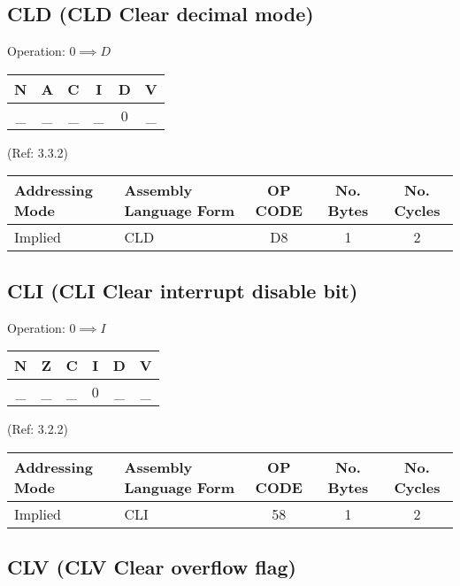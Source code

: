 \documentclass{article}
\begin{document}
  \subsection{CLD (CLD Clear decimal mode)}

  Operation:  $0 \implies D$
  \begin{table}[H]
  \centering
  \begin{tabular}{|c c c c c c|}
  \hline
  N&A&C&I&D&V\\
  \hline
  \_ & \_ & \_ & \_ & 0 & \_\\
  \hline
  \end{tabular}
  \end{table}
                                (Ref: 3.3.2)
  \begin{table}[H]
  \centering
  \begin{tabular}{|l|l|c|c|c|}
  \hline
   Addressing Mode& Assembly Language Form& OP CODE &No. Bytes&No. Cycles\\
  \hline
    Implied       &   CLD                 &    D8   &    1    &    2\\
  \hline
  \end{tabular}
  \end{table}


  \subsection{CLI (CLI Clear interrupt disable bit)}

  Operation: $0 \implies I$
  \begin{table}[H]
  \centering
  \begin{tabular}{|c c c c c c|}
  \hline
  N&Z&C&I&D&V\\
  \hline
  \_ & \_ & \_ & 0 & \_ & \_\\
  \hline
  \end{tabular}
  \end{table}
                                (Ref: 3.2.2)
  \begin{table}[H]
  \centering
  \begin{tabular}{|l|l|c|c|c|}
  \hline
   Addressing Mode& Assembly Language Form& OP CODE &No. Bytes&No. Cycles\\
  \hline
    Implied       &   CLI                 &    58   &    1    &    2\\
  \hline
  \end{tabular}
  \end{table}

  \subsection{CLV (CLV Clear overflow flag)}
\end{document}
